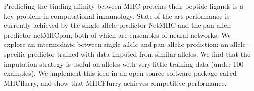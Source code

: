 Predicting the binding affinity between MHC proteins their peptide ligands is a key problem in computational immunology. State of the art performance is currently achieved by the single allele predictor NetMHC and the pan-allele predictor netMHCpan, both of which are ensembles of neural networks. We explore an intermediate between single allele and pan-allelic prediction: an allele-specific predictor trained with data imputed from similar alleles. We find that the imputation strategy is useful on alleles with very little training data (under 100 examples). We implement this idea in an open-source software package called MHCflurry, and show that MHCFlurry achieves competitive performance.